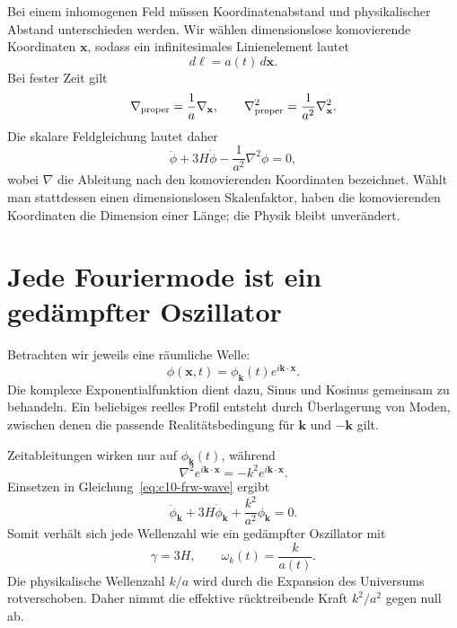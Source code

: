 Bei einem inhomogenen Feld müssen Koordinatenabstand und physikalischer Abstand unterschieden werden. Wir wählen dimensionslose komovierende Koordinaten \(\mathbf x\), sodass ein infinitesimales Linienelement lautet
\[
d\boldsymbol\ell=a(t)\,d\mathbf x.
\]
Bei fester Zeit gilt
\[
\nabla_{\rm proper}=\frac{1}{a}\nabla_{\mathbf x},
\qquad
\nabla_{\rm proper}^2=\frac{1}{a^2}\nabla_{\mathbf x}^2.
\]
Die skalare Feldgleichung lautet daher
\begin{equation}
\ddot\phi+3H\dot\phi-\frac{1}{a^2}\nabla^2\phi=0,
\label{eq:c10-frw-wave}
\end{equation}
wobei \(\nabla\) die Ableitung nach den komovierenden Koordinaten bezeichnet. Wählt man stattdessen einen dimensionslosen Skalenfaktor, haben die komovierenden Koordinaten die Dimension einer Länge; die Physik bleibt unverändert.

\begin{classroomqa}
\end{classroomqa}

\section{Jede Fouriermode ist ein gedämpfter Oszillator}

Betrachten wir jeweils eine räumliche Welle:
\begin{equation}
\phi(\mathbf x,t)
=\phi_{\mathbf k}(t)e^{i\mathbf k\cdot\mathbf x}.
\label{eq:c10-mode-ansatz}
\end{equation}
Die komplexe Exponentialfunktion dient dazu, Sinus und Kosinus gemeinsam zu behandeln. Ein beliebiges reelles Profil entsteht durch Überlagerung von Moden, zwischen denen die passende Realitätsbedingung für \(\mathbf k\) und \(-\mathbf k\) gilt.

Zeitableitungen wirken nur auf \(\phi_{\mathbf k}(t)\), während
\[
\nabla^2e^{i\mathbf k\cdot\mathbf x}
=-k^2e^{i\mathbf k\cdot\mathbf x}.
\]
Einsetzen in Gleichung~\eqref{eq:c10-frw-wave} ergibt
\begin{equation}
\ddot\phi_{\mathbf k}
+3H\dot\phi_{\mathbf k}
+\frac{k^2}{a^2}\phi_{\mathbf k}=0.
\label{eq:c10-mode-equation}
\end{equation}
Somit verhält sich jede Wellenzahl wie ein gedämpfter Oszillator mit
\begin{equation}
\gamma=3H,
\qquad
\omega_k(t)=\frac{k}{a(t)}.
\label{eq:c10-mode-identification}
\end{equation}
Die physikalische Wellenzahl \(k/a\) wird durch die Expansion des Universums rotverschoben. Daher nimmt die effektive rücktreibende Kraft \(k^2/a^2\) gegen null ab.

